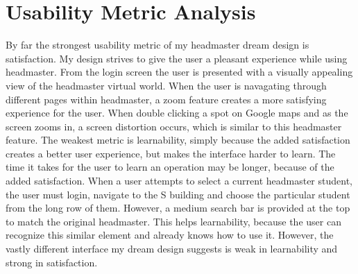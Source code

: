 \documentclass[11pt]{article}
\begin{document}
\section{Usability Metric Analysis}
By far the strongest usability metric of my headmaster dream design is satisfaction. My design strives to give the user a pleasant experience while using headmaster. From the login screen the user is presented with a visually appealing view of the headmaster virtual world. When the user is navagating through different pages within headmaster, a zoom feature creates a more satisfying experience for the user. When double clicking a spot on Google maps and as the screen zooms in, a screen distortion occurs, which is similar to this headmaster feature.
The weakest metric is learnability, simply because the added satisfaction creates a better user experience, but makes the interface harder to learn. The time it takes for the user to learn an operation may be longer, because of the added satisfaction. When a user attempts to select a current headmaster student, the user must login, navigate to the S building and choose the particular student from the long row of them. However, a medium search bar is provided at the top to match the original headmaster. This helps learnability, because the user can recognize this similar element and already knows how to use it. However, the vastly different interface my dream design suggests is weak in learnability and strong in satisfaction.
\end{document}
